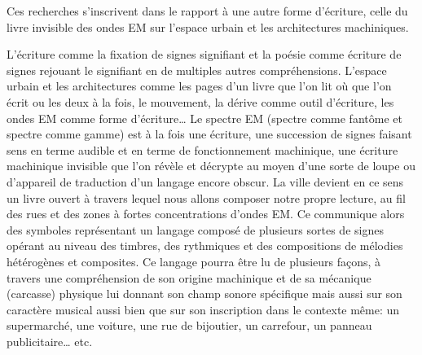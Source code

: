 {

Ces recherches s'inscrivent dans le rapport \`a une
autre forme d'\'ecriture, celle du livre invisible des
ondes EM sur l'espace urbain et les architectures
machiniques.

L'\'ecriture comme la fixation de signes signifiant et
la po\'esie comme \'ecriture de signes rejouant le signifiant en de
multiples autres compr\'ehensions. L'espace urbain et
les architectures comme les pages d'un livre que
l'on lit o\`u que l'on \'ecrit ou les
deux \`a la fois, le mouvement, la d\'erive comme outil
d'\'ecriture, les ondes EM comme forme
d'\'ecriture{\dots} Le spectre EM (spectre comme
fant\^ome et spectre comme gamme) est \`a la fois une \'ecriture, une
succession de signes faisant sens en terme audible et en terme de
fonctionnement machinique, une \'ecriture machinique invisible que
l'on r\'ev\`ele et d\'ecrypte au moyen
d'une sorte de loupe ou d'appareil de
traduction d'un langage encore obscur. La ville
devient en ce sens un livre ouvert \`a travers lequel nous allons
composer notre propre lecture, au fil des rues et des zones \`a fortes
concentrations d'ondes EM. Ce communique alors des
symboles repr\'esentant un langage compos\'e de plusieurs sortes de
signes op\'erant au niveau des timbres, des rythmiques et des
compositions de m\'elodies h\'et\'erog\`enes et composites. Ce langage
pourra \^etre lu de plusieurs fa\c{c}ons, \`a travers une
compr\'ehension de son origine machinique et de sa m\'ecanique
(carcasse) physique lui donnant son champ sonore sp\'ecifique mais
aussi sur son caract\`ere musical aussi bien que sur son inscription
dans le contexte m\^eme: un supermarch\'e, une voiture, une rue de
bijoutier, un carrefour, un panneau publicitaire{\dots} etc.

}

